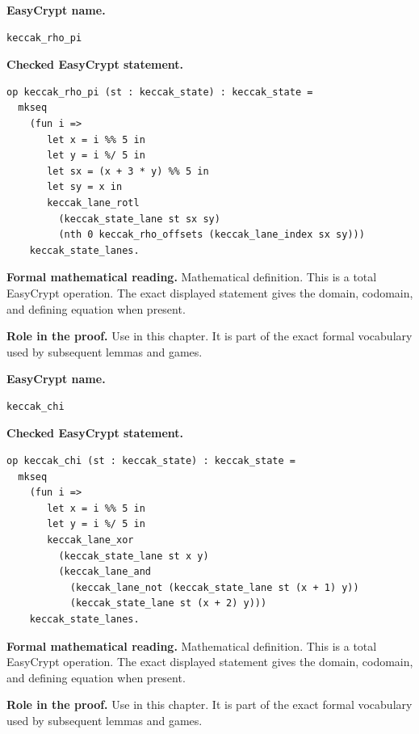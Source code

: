 \begin{formaldefinition}
\noindent\textbf{EasyCrypt name.}
\begin{lstlisting}[language=EasyCrypt,basicstyle=\ttfamily\scriptsize]
keccak_rho_pi
\end{lstlisting}
\noindent\textbf{Checked EasyCrypt statement.}
\begin{lstlisting}[language=EasyCrypt,basicstyle=\ttfamily\scriptsize]
op keccak_rho_pi (st : keccak_state) : keccak_state =
  mkseq
    (fun i =>
       let x = i %% 5 in
       let y = i %/ 5 in
       let sx = (x + 3 * y) %% 5 in
       let sy = x in
       keccak_lane_rotl
         (keccak_state_lane st sx sy)
         (nth 0 keccak_rho_offsets (keccak_lane_index sx sy)))
    keccak_state_lanes.
\end{lstlisting}
\noindent\textbf{Formal mathematical reading.}
Mathematical definition. This is a total EasyCrypt operation.  The exact displayed statement gives the domain, codomain, and defining equation when present.

\noindent\textbf{Role in the proof.}
Use in this chapter. It is part of the exact formal vocabulary used by subsequent lemmas and games.

\end{formaldefinition}

\begin{formaldefinition}
\noindent\textbf{EasyCrypt name.}
\begin{lstlisting}[language=EasyCrypt,basicstyle=\ttfamily\scriptsize]
keccak_chi
\end{lstlisting}
\noindent\textbf{Checked EasyCrypt statement.}
\begin{lstlisting}[language=EasyCrypt,basicstyle=\ttfamily\scriptsize]
op keccak_chi (st : keccak_state) : keccak_state =
  mkseq
    (fun i =>
       let x = i %% 5 in
       let y = i %/ 5 in
       keccak_lane_xor
         (keccak_state_lane st x y)
         (keccak_lane_and
           (keccak_lane_not (keccak_state_lane st (x + 1) y))
           (keccak_state_lane st (x + 2) y)))
    keccak_state_lanes.
\end{lstlisting}
\noindent\textbf{Formal mathematical reading.}
Mathematical definition. This is a total EasyCrypt operation.  The exact displayed statement gives the domain, codomain, and defining equation when present.

\noindent\textbf{Role in the proof.}
Use in this chapter. It is part of the exact formal vocabulary used by subsequent lemmas and games.

\end{formaldefinition}


